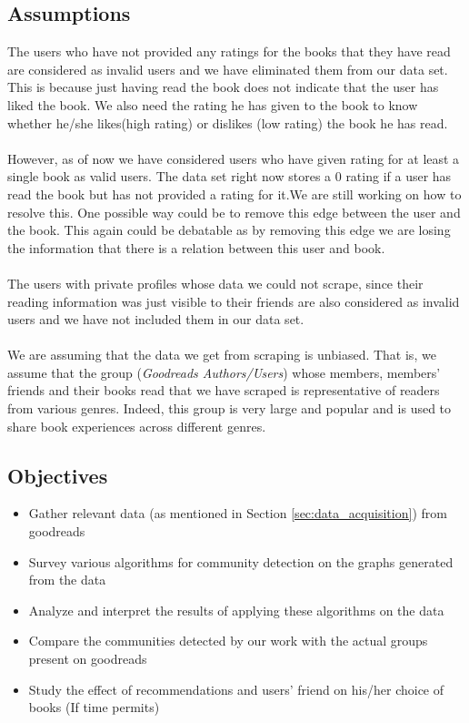 \documentclass[11pt]{article}
\begin{document}
\subsection{Assumptions}
The users who have not provided any ratings for the books that they have read are considered as invalid users and we have eliminated them from our data set. This is because just having read the book does not indicate that the user has liked the book. We also need the rating he has given to the book to know whether he/she likes(high rating) or dislikes (low rating) the book he has read.\\\\
However, as of now we have considered users who have given rating for at least a single book as valid users. The data set right now stores a 0 rating if a user has read the book but has not provided a rating for it.We are still working on how to resolve this. One possible way could be to remove this edge between the user and the book. This again could be debatable as by removing this edge we are losing the information that there is a relation between this user and book.\\\\
The users with private profiles whose data we could not scrape, since their reading information was just visible to their friends are also considered as invalid users and we have not included them in our data set.\\\\
We are assuming that the data we get from scraping is unbiased. That is, we assume that the group ({\it Goodreads Authors/Users}) whose members, members' friends and their books read that we have scraped is representative of readers from various genres. Indeed, this group is very large and popular and is used to share book experiences across different genres.

\subsection{Objectives}

\begin{itemize}
\item Gather relevant data (as mentioned in Section \ref{sec:data_acquisition}) from goodreads \checkmark
\item Survey various algorithms for community detection on the graphs generated from the data \checkmark
\item Analyze and interpret the results of applying these algorithms on the data 
\item Compare the communities detected by our work with the actual groups present on goodreads
\item Study the effect of recommendations and users' friend on his/her choice of books (If time permits)
\end{itemize}
\end{document}
